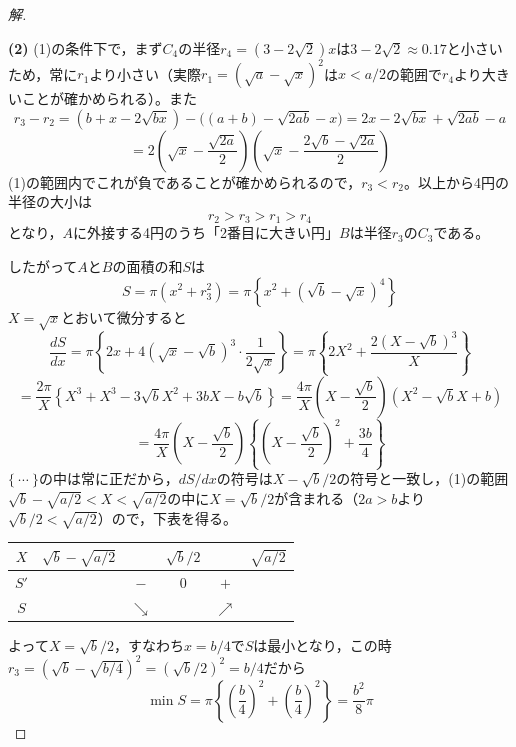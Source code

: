 \documentclass[../main.tex]{subfiles}
\begin{document}
\begin{proof}[解]
  \begin{center}
  \end{center}

  \textbf{(2)} (1)の条件下で，まず$C_4$の半径$r_4=(3-2\sqrt2)x$は$3-2\sqrt2\approx0.17$と小さいため，常に$r_1$より小さい（実際$r_1=(\sqrt a-\sqrt x)^2$は$x<a/2$の範囲で$r_4$より大きいことが確かめられる）。また
  \[
    r_3-r_2=(b+x-2\sqrt{bx})-\bigl((a+b)-\sqrt{2ab}-x\bigr)=2x-2\sqrt{bx}+\sqrt{2ab}-a
  \]
  \[
    =2\left(\sqrt x-\frac{\sqrt{2a}}2\right)\left(\sqrt x-\frac{2\sqrt b-\sqrt{2a}}2\right)
  \]
  (1)の範囲内でこれが負であることが確かめられるので，$r_3<r_2$。以上から4円の半径の大小は
  \[
    r_2>r_3>r_1>r_4
  \]
  となり，$A$に外接する4円のうち「2番目に大きい円」$B$は半径$r_3$の$C_3$である。

  したがって$A$と$B$の面積の和$S$は
  \[
    S=\pi\left(x^2+r_3^2\right)=\pi\left\{x^2+(\sqrt b-\sqrt x)^4\right\}
  \]
  $X=\sqrt x$とおいて微分すると
  \[
    \frac{dS}{dx}=\pi\left\{2x+4(\sqrt x-\sqrt b)^3\cdot\frac1{2\sqrt x}\right\}=\pi\left\{2X^2+\frac{2(X-\sqrt b)^3}{X}\right\}
  \]
  \[
    =\frac{2\pi}{X}\left\{X^3+X^3-3\sqrt bX^2+3bX-b\sqrt b\right\}=\frac{4\pi}{X}\left(X-\frac{\sqrt b}2\right)\left(X^2-\sqrt bX+b\right)
  \]
  \[
    =\frac{4\pi}{X}\left(X-\frac{\sqrt b}2\right)\left\{\left(X-\frac{\sqrt b}2\right)^2+\frac{3b}4\right\}
  \]
  $\{\ \cdots\ \}$の中は常に正だから，$dS/dx$の符号は$X-\sqrt b/2$の符号と一致し，(1)の範囲$\sqrt b-\sqrt{a/2}<X<\sqrt{a/2}$の中に$X=\sqrt b/2$が含まれる（$2a>b$より$\sqrt b/2<\sqrt{a/2}$）ので，下表を得る。
  \begin{center}
    \begin{tabular}{c|ccccc}
      $X$ & $\sqrt b-\sqrt{a/2}$ & & $\sqrt b/2$ & & $\sqrt{a/2}$ \\
      \hline
      $S'$ & & $-$ & $0$ & $+$ & \\
      \hline
      $S$ & & $\searrow$ & & $\nearrow$ &
    \end{tabular}
  \end{center}
  よって$X=\sqrt b/2$，すなわち$x=b/4$で$S$は最小となり，この時$r_3=(\sqrt b-\sqrt{b/4})^2=(\sqrt b/2)^2=b/4$だから
  \[
    \min S=\pi\left\{\left(\frac b4\right)^2+\left(\frac b4\right)^2\right\}=\frac{b^2}{8}\pi
  \]
\end{proof}
\end{document}
